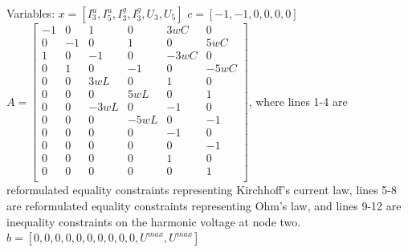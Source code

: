 Variables:\newline
$x = [I^{u}_{3},I^{u}_{5},I^{g}_{3},I^{g}_{3},U_{3},U_{5}]$\newline
$c = [-1,-1,0,0,0,0]$\newline
$A = \begin{bmatrix}
        -1      & 0     & 1     & 0     & 3wC   & 0     \\
        0       & -1    & 0     & 1     & 0     & 5wC   \\
        1       & 0     & -1    & 0     & -3wC  & 0     \\
        0       & 1     & 0     & -1    & 0     & -5wC  \\
        0       & 0     & 3wL   & 0     & 1     & 0     \\
        0       & 0     & 0     & 5wL   & 0     & 1     \\
        0       & 0     & -3wL  & 0     & -1    & 0     \\
        0       & 0     & 0     & -5wL  & 0     & -1    \\
        0       & 0     & 0     & 0     & -1    & 0     \\
        0       & 0     & 0     & 0     & 0     & -1    \\
        0       & 0     & 0     & 0     & 1     & 0     \\
        0       & 0     & 0     & 0     & 0     & 1     \\  
\end{bmatrix}$, \newline where lines 1-4 are reformulated equality constraints representing Kirchhoff's current law, lines 5-8 are reformulated equality constraints representing Ohm's law, and lines 9-12 are inequality constraints on the harmonic voltage at node two. 
$b = [0,0,0,0,0,0,0,0,0,0,U^{max},U^{max}]$

\newpage
~
\newpage